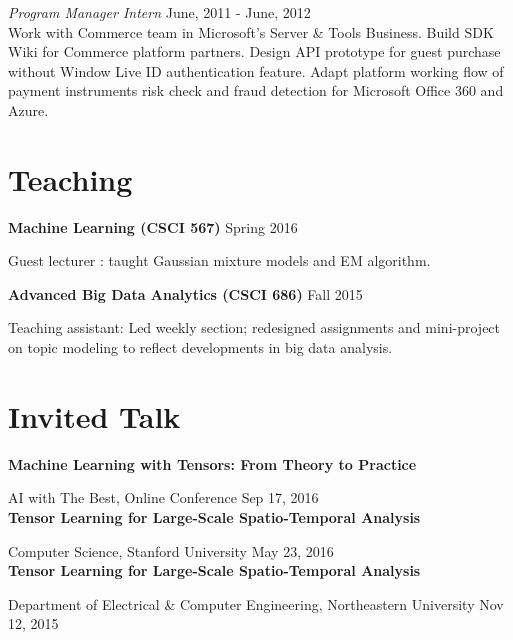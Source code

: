 \documentclass[margin,line]{res}
\begin{document}
\begin{resume}
\vspace{-.3cm}
{\em Program Manager Intern} \hfill {June, 2011 
- June, 2012}\\
 Work with Commerce team in Microsoft’s Server \& Tools Business.
 Build SDK Wiki for Commerce platform partners.  
 Design API prototype for guest purchase without Window Live ID authentication feature.
Adapt platform working flow of payment instruments risk check and fraud detection for Microsoft Office 360 and Azure.


\section{\sc Teaching }
 {\bf Machine Learning (CSCI 567)}   \hfill  { Spring 2016 } 
 
 \vspace{-.3cm}
 Guest  lecturer : taught Gaussian mixture models and EM algorithm.
 
 
 {\bf Advanced Big Data Analytics (CSCI 686)}   \hfill  {Fall 2015} 
 
 \vspace{-.3cm}
Teaching assistant: Led weekly section; redesigned assignments and mini-project on topic modeling to reflect developments in big data analysis. 


\section{\sc Invited Talk}
{\bf Machine Learning with Tensors: From Theory to Practice}
 \vspace{-.3cm}
 
 AI with The Best, Online Conference \hfill {Sep 17, 2016}\\
 
 
 {\bf Tensor Learning for Large-Scale Spatio-Temporal Analysis} 
 
 \vspace{-.3cm}
 Computer Science,  Stanford University  \hfill {May 23, 2016}\\
 
  {\bf Tensor Learning for Large-Scale Spatio-Temporal Analysis} 
  
 \vspace{-.3cm}
Department of  Electrical \& Computer Engineering,  Northeastern University  \hfill {Nov 12, 2015}\\




\end{resume}
\end{document}

